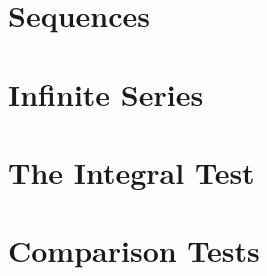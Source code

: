 \documentclass{report}
\begin{document}
\section{Sequences}
\begin{quote}

\end{quote}


\section{Infinite Series }
\begin{quote}

\end{quote}


\section{The Integral Test }
\begin{quote}

\end{quote}


\section{Comparison Tests }
\begin{quote}

\end{quote}

\end{document}
